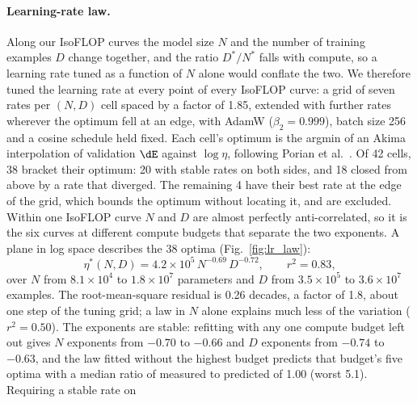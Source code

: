 
\paragraph{Learning-rate law.}
Along our IsoFLOP curves the model size $N$ and the number of training examples
$D$ change together, and the ratio $D^*/N^*$ falls with compute, so a learning
rate tuned as a function of $N$ alone would conflate the two. We therefore tuned
the learning rate at every point of every IsoFLOP curve: a grid of seven rates
per $(N, D)$ cell spaced by a factor of 1.85, extended with further rates wherever
the optimum fell at an edge, with AdamW ($\beta_2 = 0.999$), batch size 256 and a
cosine schedule held fixed. Each cell's optimum is the argmin of an
Akima interpolation of validation $\dE$ against $\log\eta$, following
Porian et al.~\cite{porian2024}. Of 42 cells, 38 bracket their optimum: 20 with
stable rates on both sides, and 18 closed from above by a rate that diverged.
The remaining 4 have their best rate at the edge of the grid, which bounds the
optimum without locating it, and are excluded. Within one IsoFLOP curve $N$ and
$D$ are almost perfectly anti-correlated, so it is the six curves at different
compute budgets that separate the two exponents. A plane in log space describes
the 38 optima (Fig.~\ref{fig:lr_law}):
\begin{equation}
  \eta^*(N, D) = 4.2\times10^{5}\, N^{-0.69}\, D^{-0.72}, \qquad r^2 = 0.83,
\end{equation}
over $N$ from $8.1\times10^{4}$ to $1.8\times10^{7}$ parameters and $D$ from
$3.5\times10^{5}$ to $3.6\times10^{7}$ examples. The root-mean-square residual is
0.26 decades, a factor of 1.8, about one step of the tuning grid; a law in $N$
alone explains much less of the variation ($r^2 = 0.50$). The exponents are
stable: refitting with any one compute budget left out gives $N$ exponents from
$-0.70$ to $-0.66$ and $D$ exponents from $-0.74$ to $-0.63$, and the law fitted
without the highest budget predicts that budget's five optima with a median
ratio of measured to predicted of 1.00 (worst 5.1). Requiring a stable rate on

